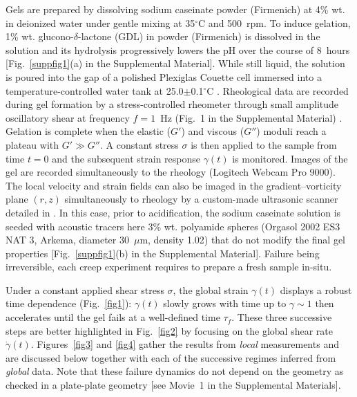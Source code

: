 \documentclass[twocolumn,superscriptaddress,showpacs,preprintnumbers,amsmath,amssymb,prl]{revtex4}
\newcommand\gp{\dot\gamma}
\begin{document}
Gels are prepared by dissolving sodium caseinate powder (Firmenich) at 4\% wt. in deionized water under gentle mixing at 35$^{\circ}$C and 500~rpm. To induce gelation, 1\% wt. glucono-$\delta$-lactone (GDL) in powder (Firmenich) is dissolved in the solution and its hydrolysis progressively lowers the pH over the course of 8~hours [Fig.~\ref{suppfig1}(a) in the Supplemental Material]. While still liquid, the solution is poured into the gap of a polished Plexiglas Couette cell immersed into a temperature-controlled water tank at 25.0$\pm$0.1$^{\circ}$C \cite{note}. Rheological data are recorded during gel formation by a stress-controlled rheometer through small amplitude oscillatory shear at frequency $f=1$~Hz (Fig.~1 in the Supplemental Material) \cite{note}. Gelation is complete when the elastic ($G'$) and viscous ($G''$) moduli reach a plateau with $G'\gg G''$. A constant stress $\sigma$ is then applied to the sample from time $t=0$ and the subsequent strain response $\gamma(t)$ is monitored. Images of the gel are recorded simultaneously to the rheology (Logitech Webcam Pro 9000). The local velocity and strain fields can also be imaged in the gradient--vorticity plane $(r,z)$ simultaneously to rheology by a custom-made ultrasonic scanner detailed in \cite{Gallot:2013}. In this case, prior to acidification, the sodium caseinate solution is seeded with acoustic tracers here 3\% wt. polyamide spheres (Orgasol 2002 ES3 NAT 3, Arkema, diameter 30~$\mu$m, density 1.02) that do not modify the final gel properties [Fig.~\ref{suppfig1}(b) in the Supplemental Material]. Failure being irreversible, each creep experiment requires to prepare a fresh sample in-situ.  

Under a constant applied shear stress $\sigma$, the global strain $\gamma(t)$ displays a robust time dependence (Fig.~\ref{fig1}): $\gamma(t)$ slowly grows with time up to $\gamma \sim 1$ then accelerates until the gel fails at a well-defined time $\tau_f$. These three successive steps are better highlighted in Fig.~\ref{fig2} by focusing on the global shear rate $\gp(t)$. Figures~\ref{fig3} and \ref{fig4} gather the results from {\it local} measurements and are discussed below together with each of the successive regimes inferred from {\it global} data. Note that these failure dynamics do not depend on the geometry as checked in a plate-plate geometry [see Movie~1 in the Supplemental Materials].
\end{document}
